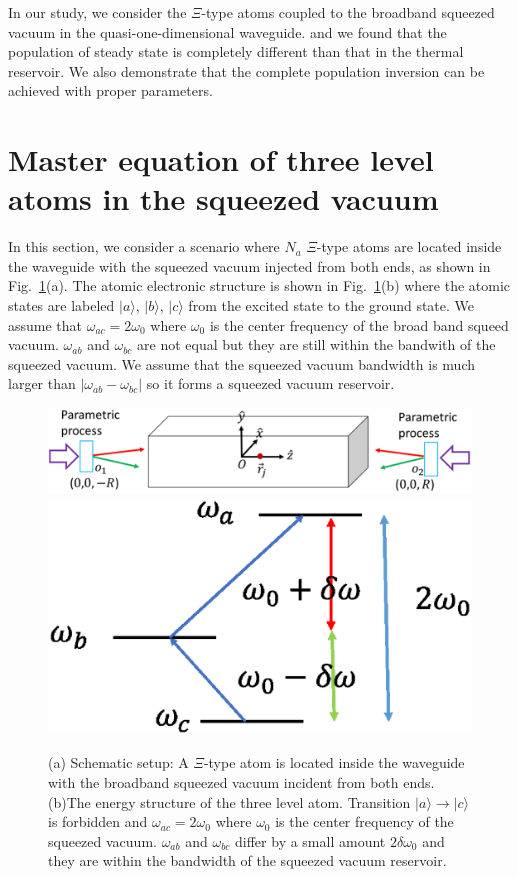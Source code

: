 \documentclass[aps,showpacs,twocolumn,twoside,groupedaddress]{revtex4}
\begin{document}
In our study, we consider the $\Xi$-type atoms coupled to the broadband squeezed vacuum in the quasi-one-dimensional waveguide. and we found that the population of steady state is completely different than that in the thermal reservoir. We also demonstrate that the complete population inversion can be achieved with proper parameters.

\section{Master equation of three level atoms in the squeezed vacuum}
In this section, we consider a scenario where $N_a$ $\Xi$-type atoms are located inside the waveguide with the squeezed vacuum injected from both ends, as shown in Fig.~\ref{1}(a). The atomic electronic structure is shown in Fig.~\ref{1}(b) where the atomic states are labeled $|a\rangle$, $|b\rangle$, $|c\rangle$ from the excited state to the ground state. We assume that $\omega_{ac}=2\omega_0$ where $\omega_0$ is the center frequency of the broad band squeed vacuum.  $\omega_{ab}$ and $\omega_{bc}$ are not equal but they are still within the bandwith of the squeezed vacuum. We assume that the squeezed vacuum bandwidth is much larger than $|\omega_{ab}-\omega_{bc}|$ so it forms a squeezed vacuum reservoir. 
\begin{figure}
\includegraphics[width=1.5\columnwidth]{fig1.eps}
\includegraphics[width=0.5\columnwidth]{fig2.eps}
\caption{(a) Schematic setup: A $\Xi$-type atom is located inside the waveguide with the broadband squeezed vacuum incident from both ends. (b)The energy structure of the three level atom. Transition $|a\rangle\rightarrow|c\rangle$ is forbidden and $\omega_{ac}=2\omega_0$ where $\omega_0$ is the center frequency of the squeezed vacuum. $\omega_{ab}$ and $\omega_{bc}$ differ by a small amount $2\delta\omega_0$ and they are within the bandwidth of the squeezed vacuum reservoir.}
\label{1}
\end{figure}
\end{document}
